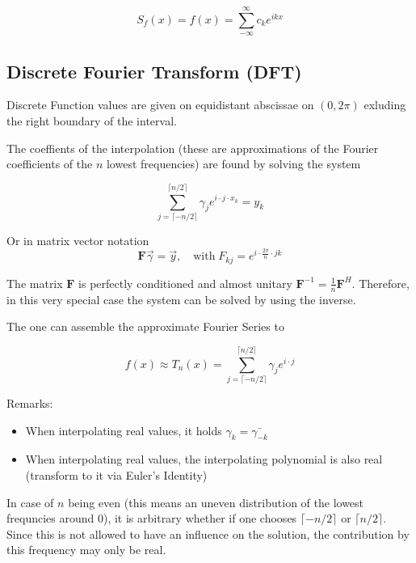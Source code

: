 \documentclass[
    a4paper,
    11pt
]{article}
\begin{document}
\begin{equation}
    S_f(x) = f(x) = \sum_{-\infty}^{\infty}c_k e^{ikx}
\end{equation}

\subsection{Discrete Fourier Transform (DFT)}

Discrete Function values are given on equidistant abscissae on $(0, 2\pi)$
exluding the right boundary of the interval.

The coeffients of the interpolation (these are approximations of the Fourier
coefficients of the $n$ lowest frequencies) are found by solving the system

\begin{equation}
    \sum_{j=\lceil -n/2 \rceil}^{\lceil n/2 \rceil} \gamma_j e^{i\cdot j \cdot x_k} = y_k
\end{equation}

Or in matrix vector notation
\begin{equation}
    \mathbf{F} \vec{\gamma} = \vec{y}, \quad \text{with} \; F_{kj} = e^{i\cdot
    \frac{2\pi}{n} \cdot jk}
\end{equation}

The matrix $\mathbf{F}$ is perfectly conditioned and almost unitary
$\mathbf{F}^{-1} = \frac{1}{n} \mathbf{F}^H$. Therefore, in this very special
case the system can be solved by using the inverse.

The one can assemble the approximate Fourier Series to

\begin{equation}
    f(x) \approx T_n(x) = \sum_{j=\lceil -n/2 \rceil}^{\lceil n/2 \rceil} \gamma_j e^{i\cdot j}
\end{equation}

Remarks:
\begin{itemize}
    \item When interpolating real values, it holds $\gamma_k =
        \bar{\gamma_{-k}}$
    \item When interpolating real values, the interpolating polynomial is also
        real (transform to it via Euler's Identity)
\end{itemize}

In case of $n$ being even (this means an uneven distribution of the lowest
frequncies around $0$), it is arbitrary whether if one chooses $\lceil -n/2
\rceil$ or $\lceil n/2 \rceil$. Since this is not allowed to have an influence
on the solution, the contribution by this frequency may only be real.
\end{document}
